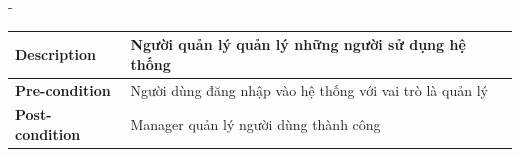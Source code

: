 \begin {list} {-}{}
\begin{itemize}
\begin{table}[h]
\begin{tabular}{|l|l|}
            \textbf{Description}      & Người quản lý quản lý những người sử dụng hệ thống                                                                                                                                                                                                                                                                                                                                                                                                                                                                                                                                                                                      \\ \hline
            \textbf{Pre-condition}    & Người dùng đăng nhập vào hệ thống với vai trò là quản lý                                                                                                                                                                                                                                                                                                                                                                                                                                                                                                                                                                                \\ \hline
            \textbf{Post-condition}   & Manager quản lý người dùng thành công                                                                                                                                                                                                                                                                                                                                                                                                                                                                                                                                                                                                   \\ \hline

\end{tabular}
\end{table}
\end{itemize}
\end{list}
